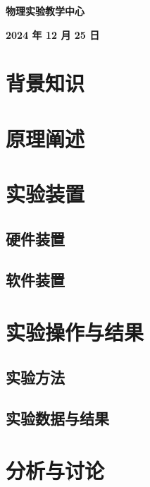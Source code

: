 \documentclass{ctexart}
\numberwithin{figure}{section}
\numberwithin{table}{section}
\begin{document}
	\vspace{0.6cm}
	
	\begin{center}
		\textbf{物理实验教学中心}
	\end{center}
	\begin{center}
		\textbf{2024 年 12 月 25 日}
	\end{center}
	
	\tableofcontents
	\newpage
	
	\section{背景知识}
	
	\newpage
	\section{原理阐述}
	
	
	\newpage
	\section{实验装置}
	
	\subsection{硬件装置}
	
	\subsection{软件装置}
	
	
	\newpage
	\section{实验操作与结果}
	
	\subsection{实验方法}
	
	\subsection{实验数据与结果}
	
	\newpage
	\section{分析与讨论}
	
\end{document}
